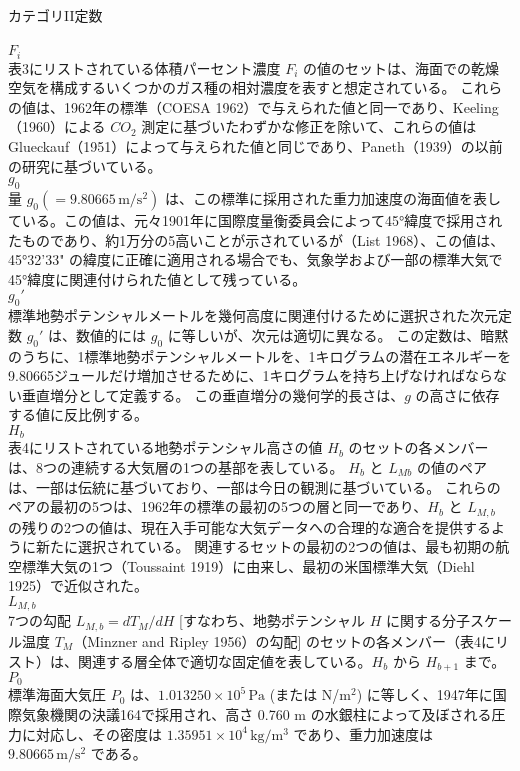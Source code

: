 \documentclass{article}
\begin{document}
カテゴリII定数\\
\\$F_i$\\
表3にリストされている体積パーセント濃度 $F_i$ の値のセットは、海面での乾燥空気を構成するいくつかのガス種の相対濃度を表すと想定されている。
これらの値は、1962年の標準（COESA 1962）で与えられた値と同一であり、Keeling（1960）による $CO_2$ 測定に基づいたわずかな修正を除いて、これらの値はGlueckauf（1951）によって与えられた値と同じであり、Paneth（1939）の以前の研究に基づいている。
\\$g_0$\\
量 $g_0 (= 9.80665 \, \mathrm{m/s^2})$ は、この標準に採用された重力加速度の海面値を表している。この値は、元々1901年に国際度量衡委員会によって45°緯度で採用されたものであり、約1万分の5高いことが示されているが（List 1968）、この値は、45°32'33" の緯度に正確に適用される場合でも、気象学および一部の標準大気で45°緯度に関連付けられた値として残っている。
\\$g_0\text{$'$}$\\
標準地勢ポテンシャルメートルを幾何高度に関連付けるために選択された次元定数 $g_0\text{$'$}$ は、数値的には $g_0$ に等しいが、次元は適切に異なる。
この定数は、暗黙のうちに、1標準地勢ポテンシャルメートルを、1キログラムの潜在エネルギーを9.80665ジュールだけ増加させるために、1キログラムを持ち上げなければならない垂直増分として定義する。
この垂直増分の幾何学的長さは、$g$ の高さに依存する値に反比例する。
\\$H_b$\\
表4にリストされている地勢ポテンシャル高さの値 $H_b$ のセットの各メンバーは、8つの連続する大気層の1つの基部を表している。
$H_b$ と $L_{Mb}$ の値のペアは、一部は伝統に基づいており、一部は今日の観測に基づいている。
これらのペアの最初の5つは、1962年の標準の最初の5つの層と同一であり、$H_b$ と $L_{M,b}$ の残りの2つの値は、現在入手可能な大気データへの合理的な適合を提供するように新たに選択されている。
関連するセットの最初の2つの値は、最も初期の航空標準大気の1つ（Toussaint 1919）に由来し、最初の米国標準大気（Diehl 1925）で近似された。
\\$L_{M,b}$\\
7つの勾配 $L_{M,b} = dT_M/dH$ [すなわち、地勢ポテンシャル $H$ に関する分子スケール温度 $T_M$（Minzner and Ripley 1956）の勾配] のセットの各メンバー（表4にリスト）は、関連する層全体で適切な固定値を表している。$H_b$ から $H_{b+1}$ まで。
\\$P_0$\\
標準海面大気圧 $P_0$ は、$1.013250 \times 10^{5} \, \mathrm{Pa}$ (または N/m$^2$) に等しく、1947年に国際気象機関の決議164で採用され、高さ 0.760 m の水銀柱によって及ぼされる圧力に対応し、その密度は $1.35951 \times 10^{4} \, \mathrm{kg/m^3}$ であり、重力加速度は $9.80665 \, \mathrm{m/s^2}$ である。
\end{document}
